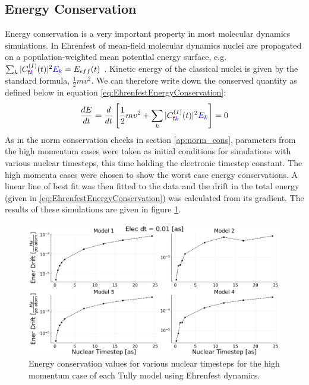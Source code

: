 \subsection{Energy Conservation}
Energy conservation is a very important property in most molecular dynamics simulations. In Ehrenfest of mean-field molecular dynamics nuclei are propagated on a population-weighted mean potential energy surface, e.g. $\sum_{k}|C_{\mremove{l}\madd{k}}^{(I)}(t)|^2 \madd{E_{k}} = E_{eff}(t)$ \cite{EhrenEnerCons}. Kinetic energy of the classical nuclei is given by the standard formula,  $\frac{1}{2} m v^2$. We can therefore write down the conserved quantity as defined below in equation \eqref{eq:EhrenfestEnergyConservation}:
\begin{equation}
	\frac{d E}{dt} = \frac{d}{dt} \left[ \frac{1}{2} m v^2 + \sum_{k}|C_{\mremove{l}\madd{k}}^{(I)}(t)|^2 \madd{E_{k}}\right] = 0
  \label{eq:EhrenfestEnergyConservation}
\end{equation}
As in the norm conservation checks in section \ref{ap:norm_cons},  parameters from the high momentum cases were taken as initial conditions for simulations with various nuclear timesteps, this time holding the electronic timestep constant. The high momenta cases were chosen to show the worst case energy conservations. A linear line of best fit was then fitted to the data and the drift in the total energy (given in \eqref{eq:EhrenfestEnergyConservation}) was calculated from its gradient. The results of these simulations are given in figure \ref{fig:EhrenEnerCons}.
\begin{figure}[ht]
  \includegraphics[width=\textwidth]{../img/CTMQC/TullyModels/Ehren_EnerCons.png}
  \caption{\label{fig:EhrenEnerCons}Energy conservation values for various nuclear timesteps for the high momentum case of each Tully model using Ehrenfest dynamics.}
\end{figure}
